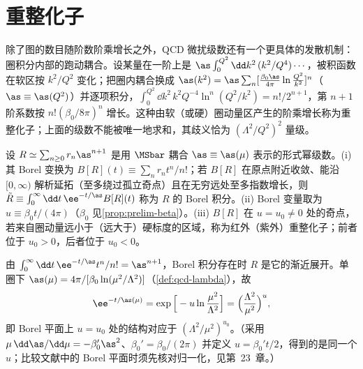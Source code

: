 \section{重整化子}\label{sec:power-renormalons}

除了图的数目随阶数阶乘增长之外，QCD 微扰级数还有一个更具体的发散机制：圈积分内部的跑动耦合。设某量在一阶上是 $\as\int_0^{Q^2}\dd k^2\,(k^2/Q^4)\cdots$，被积函数在软区按 $k^2/Q^2$ 变化；把圈内耦合换成 $\as(k^2)=\as\sum_n[\frac{\beta_0\as}{4\pi}\ln\frac{Q^2}{k^2}]^n$（$\as\equiv\as(Q^2)$）并逐项积分，$\int_0^{Q^2}\dd k^2\,k^2Q^{-4}\ln^n(Q^2/k^2)=n!/2^{n+1}$，第 $n+1$ 阶系数按 $n!(\beta_0/8\pi)^n$ 增长。这种由软（或硬）圈动量区产生的阶乘增长称为重整化子\cite{tHooft1979}；上面的级数不能被唯一地求和，其歧义恰为 $(\Lambda^2/Q^2)^2$ 量级。

\begin{definition}\label{def:power-borel}
设 $R\simeq\sum_{n\ge0}r_n\as^{n+1}$ 是用 $\MSbar$ 耦合 $\as\equiv\as(\mu)$ 表示的形式幂级数。(i) 其 Borel 变换为 $B[R](t)\equiv\sum_nr_nt^n/n!$；若 $B[R]$ 在原点附近收敛、能沿 $[0,\infty)$ 解析延拓（至多绕过孤立奇点）且在无穷远处至多指数增长，则 $\tilde R\equiv\int_0^\infty\dd t\,\ee^{-t/\as}B[R](t)$ 称为 $R$ 的 Borel 积分。(ii) Borel 变量取为 $u\equiv\beta_0t/(4\pi)$（$\beta_0$ 见\cref{prop:prelim-beta}）。(iii) $B[R]$ 在 $u=u_0\ne0$ 处的奇点，若来自圈动量远小于（远大于）硬标度的区域，称为红外（紫外）重整化子；前者位于 $u_0>0$，后者位于 $u_0<0$。
\end{definition}

由 $\int_0^\infty\dd t\,\ee^{-t/\as}t^n/n!=\as^{n+1}$，Borel 积分存在时 $R$ 是它的渐近展开。单圈下 $\as(\mu)=4\pi/[\beta_0\ln(\mu^2/\Lambda^2)]$（\cref{def:qcd-lambda}），故
\begin{equation}\label{eq:power-borel-lambda}
\ee^{-t/\as(\mu)}=\exp\Big[-u\ln\frac{\mu^2}{\Lambda^2}\Big]=\Big(\frac{\Lambda^2}{\mu^2}\Big)^{u},
\end{equation}
即 Borel 平面上 $u=u_0$ 处的结构对应于 $(\Lambda^2/\mu^2)^{u_0}$。（采用 $\mu\,\dd\as/\dd\mu=-\beta_0'\as^2$、$\beta_0'=\beta_0/(2\pi)$ 并定义 $u=\beta_0't/2$，得到的是同一个 $u$；比较文献中的 Borel 平面时须先核对归一化，见第~23~章。）

